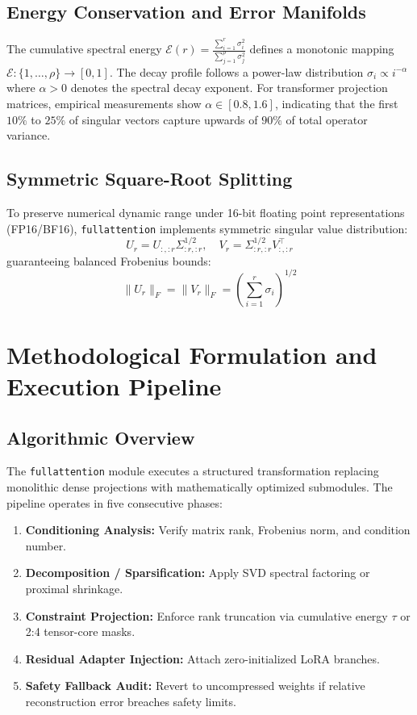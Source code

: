 {\subsection{Energy Conservation and Error Manifolds}
The cumulative spectral energy $\mathcal{E}(r) = \frac{\sum_{i=1}^r \sigma_i^2}{\sum_{j=1}^\rho \sigma_j^2}$ defines a monotonic mapping $\mathcal{E}: \{1, \dots, \rho\} \to [0, 1]$. The decay profile follows a power-law distribution $\sigma_i \propto i^{-\alpha}$ where $\alpha > 0$ denotes the spectral decay exponent. For transformer projection matrices, empirical measurements show $\alpha \in [0.8, 1.6]$, indicating that the first $10\%$ to $25\%$ of singular vectors capture upwards of $90\%$ of total operator variance.

\subsection{Symmetric Square-Root Splitting}
To preserve numerical dynamic range under 16-bit floating point representations (FP16/BF16), \texttt{fullattention} implements symmetric singular value distribution:
\[
U_r = U_{:, :r} \Sigma_{:r, :r}^{1/2}, \quad V_r = \Sigma_{:r, :r}^{1/2} V_{:, :r}^\top
\]
guaranteeing balanced Frobenius bounds:
\[
\|U_r\|_F = \|V_r\|_F = \left( \sum_{i=1}^{r} \sigma_i \right)^{1/2}
\]


\section{Methodological Formulation and Execution Pipeline}

\subsection{Algorithmic Overview}
The \texttt{fullattention} module executes a structured transformation replacing monolithic dense projections with mathematically optimized submodules. The pipeline operates in five consecutive phases:
\begin{enumerate}
\item \textbf{Conditioning Analysis:} Verify matrix rank, Frobenius norm, and condition number.
\item \textbf{Decomposition / Sparsification:} Apply SVD spectral factoring or proximal shrinkage.
\item \textbf{Constraint Projection:} Enforce rank truncation via cumulative energy $\tau$ or 2:4 tensor-core masks.
\item \textbf{Residual Adapter Injection:} Attach zero-initialized LoRA branches.
\item \textbf{Safety Fallback Audit:} Revert to uncompressed weights if relative reconstruction error breaches safety limits.
\end{enumerate}

}
